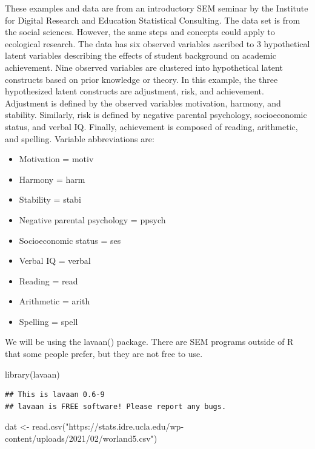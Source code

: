 \documentclass[
]{article}
\newenvironment{Shaded}{\begin{snugshade}}{\end{snugshade}}
\newcommand{\FunctionTok}[1]{\textcolor[rgb]{0.00,0.00,0.00}{#1}}
\newcommand{\NormalTok}[1]{#1}
\newcommand{\OtherTok}[1]{\textcolor[rgb]{0.56,0.35,0.01}{#1}}
\newcommand{\StringTok}[1]{\textcolor[rgb]{0.31,0.60,0.02}{#1}}
\providecommand{\tightlist}{%
  \setlength{\itemsep}{0pt}\setlength{\parskip}{0pt}}
\begin{document}
These examples and data are from an introductory SEM seminar by the
Institute for Digital Research and Education Statistical Consulting. The
data set is from the social sciences. However, the same steps and
concepts could apply to ecological research. The data has six observed
variables ascribed to 3 hypothetical latent variables describing the
effects of student background on academic achievement. Nine observed
variables are clustered into hypothetical latent constructs based on
prior knowledge or theory. In this example, the three hypothesized
latent constructs are adjustment, risk, and achievement. Adjustment is
defined by the observed variables motivation, harmony, and stability.
Similarly, risk is defined by negative parental psychology,
socioeconomic status, and verbal IQ. Finally, achievement is composed of
reading, arithmetic, and spelling. Variable abbreviations are:

\begin{itemize}
\tightlist
\item
  Motivation = motiv
\item
  Harmony = harm
\item
  Stability = stabi
\item
  Negative parental psychology = ppsych
\item
  Socioeconomic status = ses
\item
  Verbal IQ = verbal
\item
  Reading = read
\item
  Arithmetic = arith
\item
  Spelling = spell
\end{itemize}

We will be using the lavaan() package. There are SEM programs outside of
R that some people prefer, but they are not free to use.

\begin{Shaded}
\begin{Highlighting}[]
\FunctionTok{library}\NormalTok{(lavaan)}
\end{Highlighting}
\end{Shaded}

\begin{verbatim}
## This is lavaan 0.6-9
## lavaan is FREE software! Please report any bugs.
\end{verbatim}

\begin{Shaded}
\begin{Highlighting}[]
\NormalTok{dat }\OtherTok{\textless{}{-}} \FunctionTok{read.csv}\NormalTok{(}\StringTok{"https://stats.idre.ucla.edu/wp{-}content/uploads/2021/02/worland5.csv"}\NormalTok{)}
\end{Highlighting}
\end{Shaded}
\end{document}
